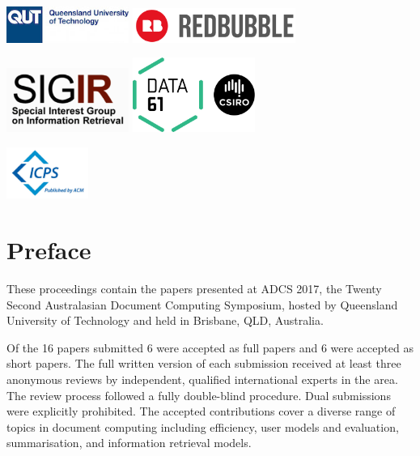 \documentclass[a4paper]{article}
\begin{document}
\begin{center}
\includegraphics[width=0.3\textwidth]{qut_logo_2lines.jpg} \hspace{4em}
\includegraphics[width=0.4\textwidth]{redbubble.png} 


\vspace{1em}

\includegraphics[width=0.3\textwidth]{sigir-logo.png} \hspace{4em}
\includegraphics[width=0.3\textwidth]{csiro-logo}
\end{center}

\vspace{1in}

\hfill\includegraphics[width=0.2\textwidth]{icps-logo}

\newpage

\section*{Preface}

These proceedings contain the papers presented at ADCS 2017, the Twenty Second 
Australasian Document Computing Symposium, hosted by Queensland University of Technology 
and held in Brisbane, QLD, Australia.

Of the 16 papers submitted 6 were accepted as full papers and 6 were accepted
as short papers. The full  written  version  of each submission received at
least three anonymous reviews by independent, qualified international experts
in the area. The review process followed a fully double-blind procedure. Dual submissions were explicitly prohibited.  The accepted
contributions cover a diverse range of topics in document computing including efficiency, user models and evaluation, summarisation, and information retrieval
models.
\end{document}
